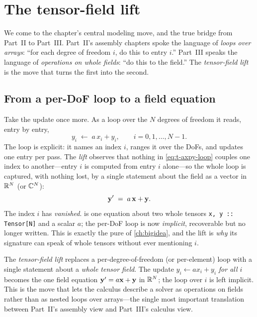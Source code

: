 \section{The tensor-field lift}
\label{sec:t-lift}

We come to the chapter's central modeling move, and the true bridge from Part~II
to Part~III. Part~II's assembly chapters spoke the language of \emph{loops over
arrays}: ``for each degree of freedom $i$, do this to entry $i$.'' Part~III speaks
the language of \emph{operations on whole fields}: ``do this to the field.'' The
\emph{tensor-field lift} is the move that turns the first into the second.

\subsection{From a per-DoF loop to a field equation}
\label{sec:t-lift-what}

Take the  update once more. As a loop over the $N$ degrees of freedom
it reads, entry by entry,
\begin{equation}
  y_i \;\leftarrow\; a\,x_i + y_i, \qquad i = 0,1,\dots,N-1 .
  \label{eq:t-axpy-loop}
\end{equation}
The loop is explicit: it names an index $i$, ranges it over the DoFs, and updates
one entry per pass. The \emph{lift} observes that nothing in
\cref{eq:t-axpy-loop} couples one index to another---entry $i$ is computed from
entry $i$ alone---so the whole loop is captured, with nothing lost, by a single
statement about the field as a vector in $\mathbb{R}^N$ (or $\mathbb{C}^N$):
\begin{equation}
  \mathbf{y}' \;=\; a\,\mathbf{x} + \mathbf{y} .
  \label{eq:t-axpy-lift}
\end{equation}
The index $i$ has \emph{vanished}.  is one equation about
two whole tensors \lstinline[style=l4style]|x, y :: Tensor[N]| and a scalar $a$;
the per-DoF loop is now \emph{implicit}, recoverable but no longer written. This
is exactly the pure  of \cref{ch:bigidea}, and the lift is \emph{why}
its signature can speak of whole tensors without ever mentioning $i$.

\begin{keyidea}
The \emph{tensor-field lift} replaces a per-degree-of-freedom (or per-element)
loop with a single statement about a \emph{whole tensor field}. The update
$y_i \leftarrow a x_i + y_i$ \emph{for all $i$} becomes the one field equation
$\mathbf{y}' = a\mathbf{x} + \mathbf{y}$ in $\mathbb{R}^N$; the loop over $i$ is left implicit. This is the
move that lets the calculus describe a solver as operations on fields rather than
as nested loops over arrays---the single most important translation between
Part~II's assembly view and Part~III's calculus view.
\end{keyidea}

